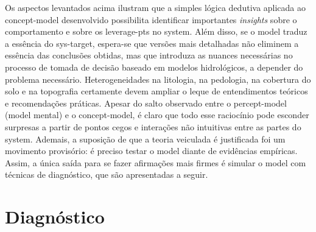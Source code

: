 \documentclass[./main.tex]{subfiles}
\begin{document}
\par Os aspectos levantados acima ilustram que a simples lógica dedutiva aplicada ao \gls{concept-model} desenvolvido possibilita identificar importantes \textit{insights} sobre o comportamento e sobre os \gls{leverage-pts} no \gls{system}. Além disso, se o \gls{model} traduz a essência do \gls{sys-target}, espera-se que versões mais detalhadas não eliminem a essência das conclusões obtidas, mas que introduza as nuances necessárias no processo de tomada de decisão baseado em modelos hidrológicos, a depender do problema necessário. Heterogeneidades na litologia, na pedologia, na cobertura do solo e na topografia certamente devem ampliar o leque de entendimentos teóricos e recomendações práticas. Apesar do salto observado entre o \gls{percept-model} (\gls{model} mental) e o \gls{concept-model}, é claro que todo esse raciocínio pode esconder surpresas a partir de pontos cegos e interações não intuitivas entre as partes do \gls{system}. Ademais, a suposição de que a \gls{teoria} veiculada é justificada foi um movimento provisório: é preciso testar o \gls{model} diante de evidências empíricas. Assim, a única saída para se fazer afirmações mais firmes é simular o \gls{model} com técnicas de diagnóstico, que são apresentadas a seguir.

\section{Diagnóstico} \label{sec:sys:diags}
\end{document}

